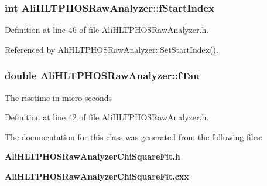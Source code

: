 \subsubsection{\setlength{\rightskip}{0pt plus 5cm}int {\bf Ali\-HLTPHOSRaw\-Analyzer::f\-Start\-Index}\hspace{0.3cm}{\tt  [protected, inherited]}}\label{classAliHLTPHOSRawAnalyzer_AliHLTPHOSRawAnalyzerPeakFinderp7}




Definition at line 46 of file Ali\-HLTPHOSRaw\-Analyzer.h.

Referenced by Ali\-HLTPHOSRaw\-Analyzer::Set\-Start\-Index().
\subsubsection{\setlength{\rightskip}{0pt plus 5cm}double {\bf Ali\-HLTPHOSRaw\-Analyzer::f\-Tau}\hspace{0.3cm}{\tt  [protected, inherited]}}\label{classAliHLTPHOSRawAnalyzer_AliHLTPHOSRawAnalyzerPeakFinderp4}


The risetime in micro seconds 

Definition at line 42 of file Ali\-HLTPHOSRaw\-Analyzer.h.

The documentation for this class was generated from the following files:\begin{CompactItemize}
\item 
{\bf Ali\-HLTPHOSRaw\-Analyzer\-Chi\-Square\-Fit.h}\item 
{\bf Ali\-HLTPHOSRaw\-Analyzer\-Chi\-Square\-Fit.cxx}\end{CompactItemize}
